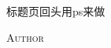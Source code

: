\documentclass[9pt]{book}
\begin{document}
\pagestyle{mystyle}

\begin{titlepage}
    \vspace*{2cm}

    \noindent
    \vspace*{0.5cm}
    \Huge{标题页回头用ps来做}

    \vspace{1.5cm}
    { \textsc{Author}}
    \null\vfill
    \vspace*{1cm}
    \noindent
    \hfill
\end{titlepage}

\tableofcontents

\thispagestyle{empty}
\blankpage

\newpage
\setcounter{page}{1}



\end{document}
